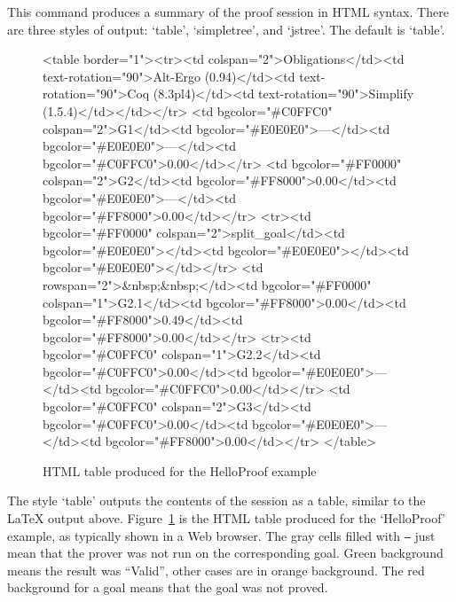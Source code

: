 This command produces a summary of the proof session in HTML syntax.
There are three styles of output: `table', `simpletree', and
`jstree'. The default is `table'.

\begin{figure}[t]
\begin{center}
\begin{latexonly}
\end{latexonly}
\begin{htmlonly}
\begin{rawhtml}
<table border="1"><tr><td colspan="2">Obligations</td><td text-rotation="90">Alt-Ergo (0.94)</td><td text-rotation="90">Coq (8.3pl4)</td><td text-rotation="90">Simplify (1.5.4)</td></td></tr>
<td bgcolor="#C0FFC0" colspan="2">G1</td><td bgcolor="#E0E0E0">---</td><td bgcolor="#E0E0E0">---</td><td bgcolor="#C0FFC0">0.00</td></tr>
<td bgcolor="#FF0000" colspan="2">G2</td><td bgcolor="#FF8000">0.00</td><td bgcolor="#E0E0E0">---</td><td bgcolor="#FF8000">0.00</td></tr>
<tr><td bgcolor="#FF0000" colspan="2">split_goal</td><td bgcolor="#E0E0E0"></td><td bgcolor="#E0E0E0"></td><td bgcolor="#E0E0E0"></td></tr>
<td rowspan="2">&nbsp;&nbsp;</td><td bgcolor="#FF0000" colspan="1">G2.1</td><td bgcolor="#FF8000">0.00</td><td bgcolor="#FF8000">0.49</td><td bgcolor="#FF8000">0.00</td></tr>
<tr><td bgcolor="#C0FFC0" colspan="1">G2.2</td><td bgcolor="#C0FFC0">0.00</td><td bgcolor="#E0E0E0">---</td><td bgcolor="#C0FFC0">0.00</td></tr>
<td bgcolor="#C0FFC0" colspan="2">G3</td><td bgcolor="#C0FFC0">0.00</td><td bgcolor="#E0E0E0">---</td><td bgcolor="#FF8000">0.00</td></tr>
</table>
\end{rawhtml}
\end{htmlonly}
\end{center}
\caption{HTML table produced for the HelloProof example}
\label{fig:html}
\end{figure}

The style `table' outputs the contents of the session as a table,
similar to the LaTeX output above. Figure~\ref{fig:html} is the HTML
table produced for the `HelloProof' example, as typically shown in a
Web browser. The gray cells filled with \texttt{---} just mean that
the prover was not run on the corresponding goal. Green background
means the result was ``Valid'', other cases are in orange
background. The red background for a goal means that the goal was not
proved.


